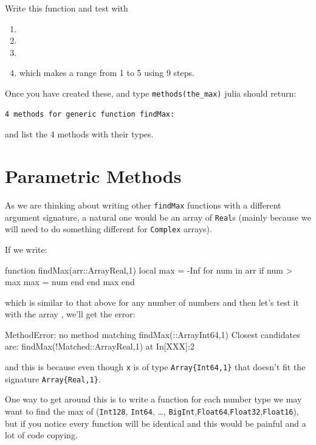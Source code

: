 Write this function and test with

\begin{enumerate}
\item  {}
\item  {}
\item  {}
\item  {} which makes a range from 1 to 5 using 9 steps.
\end{enumerate}

Once you have created these, and type \texttt{methods(the\_max)} julia
should return:

\begin{Verbatim}
4 methods for generic function findMax:
\end{Verbatim}

and list the 4 methods with their types.


\section{Parametric Methods}

As we are thinking about writing other \verb!findMax! functions with a different argument signature, a natural one would be an array of \texttt{Real}s (mainly because we will need to do something different for \texttt{Complex} arrays).

If we write:
%
\begin{jlblock}[adf]
function findMax(arr::Array{Real,1})
  local max = -Inf
  for num in arr
    if num > max
      max = num
    end
  end
  max
end
\end{jlblock}
%
which is similar to that above for any number of numbers and then let's
test it with the array , we'll get the error:

\begin{jlverbatim}[adf]
MethodError: no method matching findMax(::Array{Int64,1})
Closest candidates are:
  findMax(!Matched::Array{Real,1}) at In[XXX]:2
\end{jlverbatim}

and this is because even though \texttt{x} is of type
\texttt{Array\{Int64,1\}} that doesn't fit the signature
\texttt{Array\{Real,1\}}.

One way to get around this is to write a function for each number type
we may want to find the max of (\texttt{Int128}, \texttt{Int64}, \ldots,
\texttt{BigInt},\texttt{Float64},\texttt{Float32},\texttt{Float16}), but
if you notice every function will be identical and this would be painful
and a lot of code copying.

